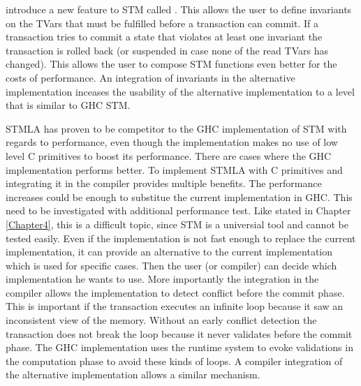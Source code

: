 \parencite{invariants} introduce a new feature to STM called .
This allows the user to define invariants on the TVars that must be fulfilled before a transaction
can commit. If a transaction tries to commit a state that violates at least one invariant the 
transaction is rolled back (or suspended in case none of the read TVars has changed). This allows
the user to compose STM functions even better for the costs of performance. An integration of 
invariants in the alternative implementation inceases the usability of the alternative implementation
to a level that is similar to GHC STM.

STMLA has proven to be competitor to the GHC implementation of STM with regards to performance, even 
though the implementation makes no use of low level C primitives to boost its performance. There are 
cases where the GHC implementation performs better. To implement STMLA 
with C primitives and integrating it in the compiler provides multiple benefits. The performance 
increases could be enough to substitue the current implementation in GHC. This need to be investigated
with additional performance test. Like stated in Chapter \ref{Chapter4}, this is a difficult topic,
since STM is a universial tool and cannot be tested easily. Even if the implementation is not fast
enough to replace the current implementation, it can provide an alternative to the current implementation
which is used for specific cases. Then the user (or compiler) can decide which implementation he wants to use. 
More importantly the integration
in the compiler allows the implementation to detect conflict before the commit phase. This is 
important if the transaction executes an infinite loop because it saw an inconsistent view of the 
memory. Without an early conflict detection the transaction does not break the loop because it never
validates before the commit phase. The GHC implementation uses the runtime system to evoke validations
in the computation phase to avoid these kinds of loops. A compiler integration of the alternative 
implementation allows a similar mechanism.

